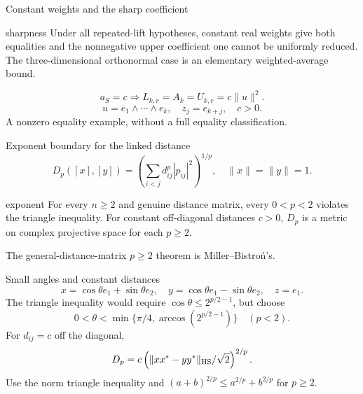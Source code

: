 \documentclass{beamer}
\begin{document}
\begin{frame}{Constant weights and the sharp coefficient}
\begin{bookresult}{sharpness}
Under all repeated-lift hypotheses, constant real weights give both equalities and the nonnegative upper coefficient one cannot be uniformly reduced. The three-dimensional orthonormal case is an elementary weighted-average bound.
\end{bookresult}
\[
a_S=c\Longrightarrow L_{k,r}=A_k=U_{k,r}=c\|u\|^2.
\]
\[
u=e_1\wedge\cdots\wedge e_k,\quad z_j=e_{k+j},\quad c>0.
\]
\small A nonzero equality example, without a full equality classification.
\end{frame}
\begin{frame}{Exponent boundary for the linked distance}
\small
\[
D_p([x],[y])=\left(\sum_{i<j}d_{ij}^p|p_{ij}|^2\right)^{1/p},\quad\|x\|=\|y\|=1.
\]
\begin{bookresult}{exponent}
For every $n\ge2$ and genuine distance matrix, every $0<p<2$ violates the triangle inequality. For constant off-diagonal distances $c>0$, $D_p$ is a metric on complex projective space for each $p\ge2$.
\end{bookresult}
\small The general-distance-matrix $p\ge2$ theorem is Miller--Bistroń’s.
\end{frame}
\begin{frame}{Small angles and constant distances}
\small
\[
x=\cos\theta e_1+\sin\theta e_2,\quad y=\cos\theta e_1-\sin\theta e_2,
\quad z=e_1.
\]
The triangle inequality would require $\cos\theta\le2^{p/2-1}$, but choose
\[
0<\theta\mathrel{<}\min\{\pi/4,\arccos(2^{p/2-1})\}\quad(p<2).
\]
For $d_{ij}=c$ off the diagonal,
\[
D_p=c\left(\|xx^*-yy^*\|_{\rm HS}/\sqrt2\right)^{2/p}.
\]
Use the norm triangle inequality and $(a+b)^{2/p}\le a^{2/p}+b^{2/p}$ for $p\ge2$.
\end{frame}
\end{document}
